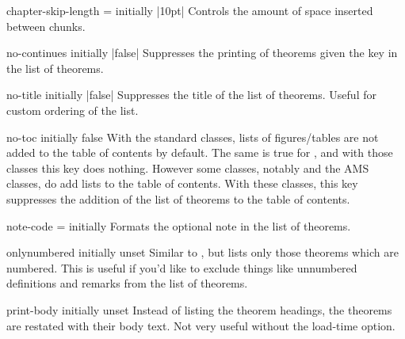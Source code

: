 \documentclass{ltxdoc}
\newcommand{\ttbraces}[1]{\braces{\texttt{#1}}}
\begin{document}
\begin{docKey}{chapter-skip-length}
  {=}
  {initially |10pt|}
Controls the amount of space inserted between chunks.
\end{docKey}

\begin{docKey}{no-continues}
  {}
  {initially |false|}
Suppresses the printing of theorems given the  key in the list of theorems.
\end{docKey}

\begin{docKey}{no-title}
  {}
  {initially |false|}
Suppresses the title of the list of theorems.
Useful for custom ordering of the list.

\begin{keythmscode}[]
\listofkeytheorems[show=example]
\listofkeytheorems[show=solution, no-title]
\end{keythmscode}

\end{docKey}

\begin{docKey}{no-toc}
  {}
  {initially false}
With the standard classes, lists of figures/tables are not added to the table of contents by default. The same is true for , and with those classes this key does nothing. However some classes, notably  and the AMS classes, do add lists to the table of contents. With these classes, this key suppresses the addition of the list of theorems to the table of contents.
\end{docKey}

\begin{docKey}{note-code}
  {=}
  {initially \ttbraces{ (\#1)}}
Formats the optional note in the list of theorems.
\end{docKey}

\begin{docKey}{onlynumbered}
  {}
  {initially unset}
Similar to , but lists only those theorems which are numbered.
This is useful if you'd like to exclude things like unnumbered definitions and remarks from the list of theorems.
\end{docKey}

\begin{docKey}{print-body}
  {}
  {initially unset}
Instead of listing the theorem headings, the theorems are restated with their body text.
Not very useful without the  load-time option.
\end{docKey}
\end{document}
